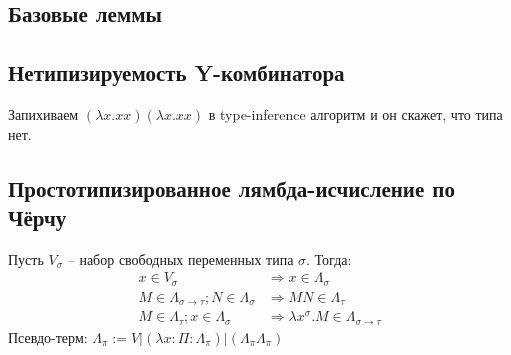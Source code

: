 \subsection{Базовые леммы}
\label{sec-4-2}


\subsection{Нетипизируемость Y-комбинатора}
\label{sec-4-3}

Запихиваем $(\lambda x . x x) (\lambda x . x x)$ в type-inference алгоритм и он
скажет, что типа нет.



\subsection{Простотипизированное лямбда-исчисление по Чёрчу}
\label{sec-4-3}

Пусть $V_\sigma$ -- набор свободных переменных типа $\sigma$. Тогда:
\begin{align*}
x \in V_\sigma &\Rightarrow x \in \Lambda_\sigma \\
M \in \Lambda_{\sigma \rightarrow \tau}; N \in \Lambda_{\sigma} &\Rightarrow M N \in \Lambda_\tau \\
M \in \Lambda_\tau; x \in \Lambda_\sigma &\Rightarrow \lambda x^\sigma . M \in \Lambda_{\sigma \rightarrow \tau}
\end{align*}
Псевдо-терм: $\Lambda_\pi := V | (\lambda x:\Pi: \Lambda_\pi) | (\Lambda_\pi
\Lambda_\pi)$